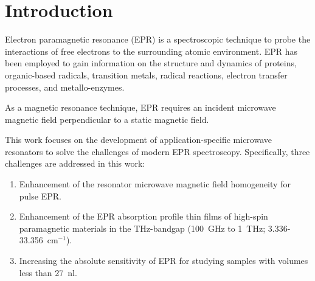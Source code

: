 \chapter[Introduction]{Introduction}

    
Electron paramagnetic resonance (EPR) is a spectroscopic technique to probe the interactions of free electrons to the surrounding atomic environment. EPR has been employed to gain information on the structure and dynamics of proteins, organic-based radicals, transition metals, radical reactions, electron transfer processes, and metallo-enzymes. 

As a magnetic resonance technique, EPR requires an incident microwave magnetic field perpendicular to a static magnetic field. 

This work focuses on the development of application-specific microwave resonators to solve the challenges of modern EPR spectroscopy. Specifically, three challenges are addressed in this work: 
\begin{enumerate}
\setlength\itemsep{-0.25em}
    \item Enhancement of the resonator microwave magnetic field homogeneity for pulse EPR.
    \item Enhancement of the EPR absorption profile thin films of high-spin paramagnetic materials in the THz-bandgap (100~GHz to 1~THz; 3.336-33.356~cm$^{-1}$).
    \item Increasing the absolute sensitivity of EPR for studying samples with volumes less than 27~nl. 
\end{enumerate}  

